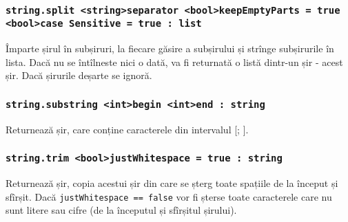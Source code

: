 \subsubsection{\lstinline|string.split <string>separator <bool>keepEmptyParts = true <bool>case Sensitive = true : list|}

Împarte șirul în subșiruri, la fiecare găsire a subșirului  și strînge subșirurile în lista. Dacă  nu se întîlneste nici o dată, va fi returnată o listă dintr-un șir - acest șir. Dacă  șirurile deșarte se ignoră.

\subsubsection{\lstinline|string.substring <int>begin <int>end : string|}

Returnează șir, care conține caracterele din intervalul [; ].

\subsubsection{\lstinline|string.trim <bool>justWhitespace = true : string|}

Returnează șir, copia acestui șir din care se șterg toate spațiile de la început și sfîrșit. Dacă \lstinline|justWhitespace == false| vor fi șterse toate caracterele care nu sunt litere sau cifre (de la începutul și sfîrșitul șirului).


